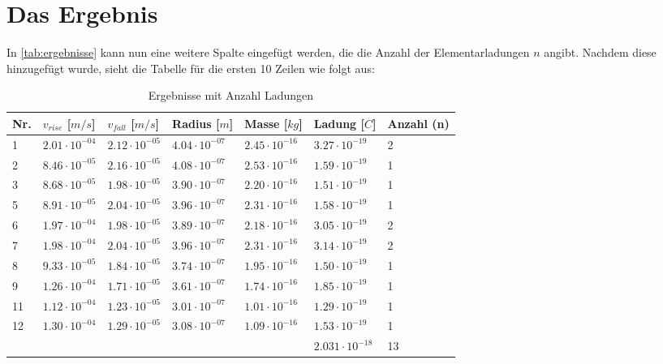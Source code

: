\section{Das Ergebnis}\label{sec:ergebnis}
In \autoref{tab:ergebnisse} kann nun eine weitere Spalte eingefügt werden, die die Anzahl der Elementarladungen $n$ angibt. Nachdem diese hinzugefügt wurde, sieht die Tabelle für die ersten 10 Zeilen wie folgt aus:

\begin{table}[H]
	\centering
	\begin{tabular}{llllll|l}
		\toprule
		Nr. & $v_{rise}$ [$m/s$] & $v_{fall}$ [$m/s$] & Radius [$m$] & Masse [$kg$]  & Ladung [$C$]& Anzahl (n) \\
		\midrule
		1 &$\mathrm{2.01 \cdot 10^{-04}}$ & $\mathrm{2.12 \cdot 10^{-05}}$ & $\mathrm{4.04 \cdot 10^{-07}}$ & $\mathrm{2.45 \cdot 10^{-16}}$ & $\mathrm{3.27 \cdot 10^{-19}}$ & 2\\
		2 &$\mathrm{8.46 \cdot 10^{-05}}$ & $\mathrm{2.16 \cdot 10^{-05}}$ & $\mathrm{4.08 \cdot 10^{-07}}$ & $\mathrm{2.53 \cdot 10^{-16}}$ & $\mathrm{1.59 \cdot 10^{-19}}$ & 1\\
		3 &$\mathrm{8.68 \cdot 10^{-05}}$ & $\mathrm{1.98 \cdot 10^{-05}}$ & $\mathrm{3.90 \cdot 10^{-07}}$ & $\mathrm{2.20 \cdot 10^{-16}}$ & $\mathrm{1.51 \cdot 10^{-19}}$ & 1\\
		5 &$\mathrm{8.91 \cdot 10^{-05}}$ & $\mathrm{2.04 \cdot 10^{-05}}$ & $\mathrm{3.96 \cdot 10^{-07}}$ & $\mathrm{2.31 \cdot 10^{-16}}$ & $\mathrm{1.58 \cdot 10^{-19}}$ & 1\\
		6 &$\mathrm{1.97 \cdot 10^{-04}}$ & $\mathrm{1.98 \cdot 10^{-05}}$ & $\mathrm{3.89 \cdot 10^{-07}}$ & $\mathrm{2.18 \cdot 10^{-16}}$ & $\mathrm{3.05 \cdot 10^{-19}}$ & 2\\
		7 &$\mathrm{1.98 \cdot 10^{-04}}$ & $\mathrm{2.04 \cdot 10^{-05}}$ & $\mathrm{3.96 \cdot 10^{-07}}$ & $\mathrm{2.31 \cdot 10^{-16}}$ & $\mathrm{3.14 \cdot 10^{-19}}$ & 2\\
		8 &$\mathrm{9.33 \cdot 10^{-05}}$ & $\mathrm{1.84 \cdot 10^{-05}}$ & $\mathrm{3.74 \cdot 10^{-07}}$ & $\mathrm{1.95 \cdot 10^{-16}}$ & $\mathrm{1.50 \cdot 10^{-19}}$ & 1\\
		9 &$\mathrm{1.26 \cdot 10^{-04}}$ & $\mathrm{1.71 \cdot 10^{-05}}$ & $\mathrm{3.61 \cdot 10^{-07}}$ & $\mathrm{1.74 \cdot 10^{-16}}$ & $\mathrm{1.85 \cdot 10^{-19}}$ & 1\\
		11 &$\mathrm{1.12 \cdot 10^{-04}}$ & $\mathrm{1.23 \cdot 10^{-05}}$ & $\mathrm{3.01 \cdot 10^{-07}}$ & $\mathrm{1.01 \cdot 10^{-16}}$ & $\mathrm{1.29 \cdot 10^{-19}}$ & 1\\
		12 &$\mathrm{1.30 \cdot 10^{-04}}$ & $\mathrm{1.29 \cdot 10^{-05}}$ & $\mathrm{3.08 \cdot 10^{-07}}$ & $\mathrm{1.09 \cdot 10^{-16}}$ & $\mathrm{1.53 \cdot 10^{-19}}$ & 1\\
		\bottomrule
		&&&&& $2.031 \cdot 10^{-18}$ & 13 \\
	\end{tabular}
	\caption{Ergebnisse mit Anzahl Ladungen}
	\label{tab:anzahlLadung}
\end{table}
